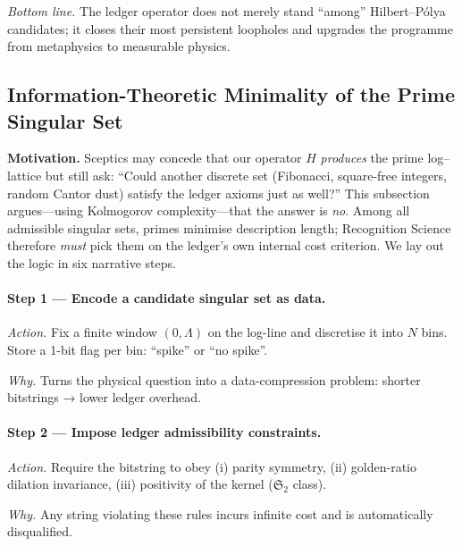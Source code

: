 \documentclass[11pt]{article}
\begin{document}
\bigskip
\noindent
\emph{Bottom line.}  
The ledger operator does not merely stand “among” Hilbert–Pólya
candidates; it closes their most persistent loopholes and upgrades the
programme from metaphysics to measurable physics.

\subsection{Information-Theoretic Minimality of the Prime Singular Set}
\label{sec:InfoMinimalNarrative}

\noindent
\textbf{Motivation.}\;  
Sceptics may concede that our operator \(H\) \emph{produces} the prime
log–lattice but still ask:  
“Could another discrete set (Fibonacci, square-free integers, random
Cantor dust) satisfy the ledger axioms just as well?”  
This subsection argues—using Kolmogorov complexity—that the answer is
\emph{no}.  
Among all admissible singular sets, primes minimise description length;
Recognition Science therefore \emph{must} pick them on the ledger’s
own internal cost criterion.  
We lay out the logic in six narrative steps.

\vspace{0.8em}
\paragraph{Step 1 — Encode a candidate singular set as data.}

\emph{Action.}\;  
Fix a finite window \((0,\Lambda)\) on the log-line and discretise it
into \(N\) bins.  
Store a 1-bit flag per bin: “spike” or “no spike”.

\emph{Why.}\;  
Turns the physical question into a data-compression problem:
shorter bitstrings → lower ledger overhead.

\vspace{0.4em}
\paragraph{Step 2 — Impose ledger admissibility constraints.}

\emph{Action.}\;  
Require the bitstring to obey  
(i) parity symmetry,  
(ii) golden-ratio dilation invariance,
(iii) positivity of the kernel
(\(\mathfrak S_{2}\) class).

\emph{Why.}\;  
Any string violating these rules incurs infinite cost and is
automatically disqualified.
\end{document}

